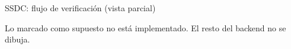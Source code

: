 \documentclass[aspectratio=169,12pt]{beamer}
\begin{document}
\begin{frame}{SSDC: flujo de verificación (vista parcial)}
\centering

\par\medskip
{\scriptsize Lo marcado como supuesto no está implementado. El resto del backend no se dibuja.}
\end{frame}
\end{document}
